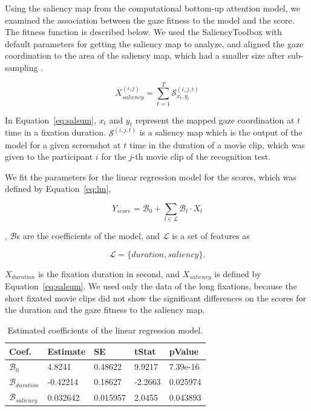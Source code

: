 \documentclass[oneside,master]{snueethesis}
\begin{document}
Using the saliency map from the computational bottom-up attention model, we examined the association between the gaze fitness to the model and the score. The fitness function is described below. We used the SaliencyToolbox with default parameters for getting the saliency map to analyze, and aligned the gaze coordination to the area of the saliency map, which had a smaller size after sub-sampling \cite{Walther2006}.

\begin{equation}\label{eq:salsum}
X_{saliency}^{(i,j)} = \sum_{t=1}^{T} \mathcal{S}_{x_{t},y_{t}}^{(i,j,t)}
\end{equation}

In Equation~\ref{eq:salsum}, $x_{t}$ and $y_{t}$ represent the mapped gaze coordination at $t$ time in a fixation duration. $\mathcal{S}^{(i,j,t)}$ is a saliency map which is the output of the model for a given screenshot at $t$ time in the duration of a movie clip, which was given to the participant $i$ for the $j$-th movie clip of the recognition test.

We fit the parameters for the linear regression model for the scores, which was defined by Equation~\ref{eq:lm},

\begin{equation}\label{eq:lm}
Y_{score} = \mathcal{B}_{0} + \sum_{l \in \mathcal{L}} \mathcal{B}_{l} \cdot X_{l}
\end{equation}

\noindent, $\mathcal{B}$s are the coefficients of the model, and $\mathcal{L}$ is a set of features as  

\begin{equation}\label{eq:l}
\mathcal{L} = \{duration, saliency\}.
\end{equation}

$X_{duration}$ is the fixation duration in second, and $X_{saliency}$ is defined by Equation~\ref{eq:salsum}. We used only the data of the long fixations, because the short fixated movie clips did not show the significant differences on the scores for the duration and the gaze fitness to the saliency map.

\begin{table}[ht]
\begin{center} 
\caption[Estimated coefficients of the linear regression model]{Estimated coefficients of the linear regression model.}
\vskip 0.12in
\label{tab:lr-coef} 
\begin{tabular}{lllll} 
\hline
Coef. & Estimate & SE & tStat & pValue \\ 
\hline
$\mathcal{B}_{0}$    &  4.8241   &  0.48622  &  9.9217 &  7.39e-16  \\
$\mathcal{B}_{duration}$ & -0.42214  &  0.18627  & -2.2663 &  0.025974    \\
$\mathcal{B}_{saliency}$ &  0.032642 &  0.015957 &  2.0455 &  0.043893    \\
\hline
\end{tabular} 
\end{center} 
\end{table}
\end{document}

